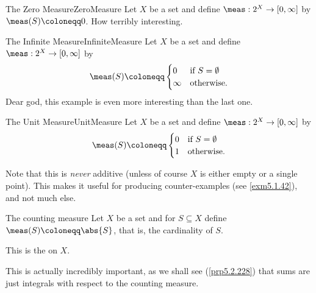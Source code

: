 \begin{exm}{The Zero Measure}{ZeroMeasure}{}
Let $X$ be a set and define $\meas :2^X\rightarrow [0,\infty ]$ by $\meas (S)\coloneqq 0$.  How terribly interesting.
\end{exm}
\begin{exm}{The Infinite Measure}{InfiniteMeasure}
Let $X$ be a set and define $\meas :2^X\rightarrow [0,\infty ]$ by
\begin{equation}
\meas (S)\coloneqq \begin{cases}0 & \text{if }S=\emptyset \\ \infty & \text{otherwise.}\end{cases}
\end{equation}
Dear god, this example is even more interesting than the last one.
\end{exm}
\begin{exm}{The Unit Measure}{UnitMeasure}
Let $X$ be a set and define $\meas :2^X\rightarrow [0,\infty ]$ by
\begin{equation}
\meas (S)\coloneqq \begin{cases}0 & \text{if }S=\emptyset \\ 1 & \text{otherwise.}\end{cases}
\end{equation}
\begin{rmk}
Note that this is \emph{never} additive (unless of course $X$ is either empty or a single point).  This makes it useful for producing counter-examples (see \cref{exm5.1.42}), and not much else.
\end{rmk}
\end{exm}
\begin{exm}{The counting measure}{}
Let $X$ be a set and for $S\subseteq X$ define $\meas (S)\coloneqq \abs{S}$, that is, the cardinality of $S$.
\begin{rmk}
This is the  on $X$.
\end{rmk}
\begin{rmk}
This is actually incredibly important, as we shall see (\cref{prp5.2.228}) that sums are just integrals with respect to the counting measure.
\end{rmk}
\end{exm}

